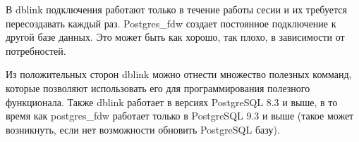 В dblink подключения работают только в течение работы сесии и их требуется пересоздавать каждый раз. Postgres\_fdw создает постоянное подключение к другой базе данных. Это может быть как хорошо, так плохо, в зависимости от потребностей.

Из положительных сторон dblink можно отнести множество полезных комманд, которые позволяют использовать его для программирования полезного функционала. Также dblink работает в версиях PostgreSQL 8.3 и выше, в то время как postgres\_fdw работает только в PostgreSQL 9.3 и выше (такое может возникнуть, если нет возможности обновить PostgreSQL базу).
